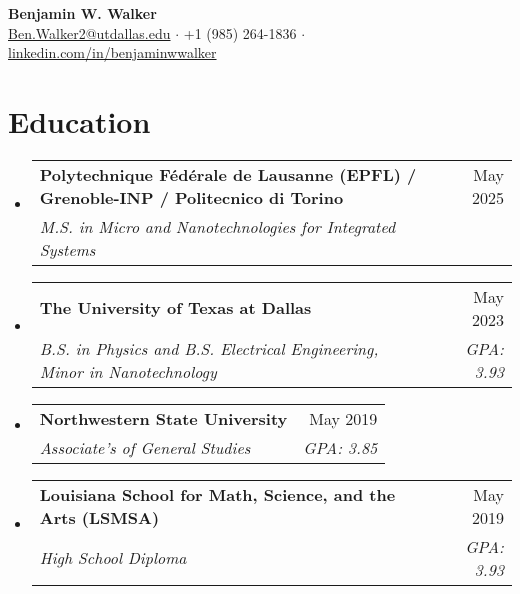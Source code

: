 \documentclass[letterpaper,11pt]{article}
\makeatletter
\newcommand{\resumeSubheading}[4]{
  \vspace{-2pt}\item
    \begin{tabular*}{0.97\textwidth}[t]{l@{\extracolsep{\fill}}r}
      \textbf{#1} & #2 \\
      \textit{\small#3} & \textit{\small #4} \\
    \end{tabular*}\vspace{-7pt}
}
\newcommand{\resumeSubHeadingListStart}{\begin{itemize}[leftmargin=0.15in, label={}]}
\newcommand{\resumeSubHeadingListEnd}{\end{itemize}}
\makeatother
\begin{document}
\begin{center}
    \textbf{\Large Benjamin W. Walker} \\ \vspace{5pt}
    \href{mailto:Ben.Walker2@utdallas.edu}{{Ben.Walker2@utdallas.edu}} 
    \hspace{1 pt} $\cdot$ \hspace{1 pt}
    +1 (985) 264-1836
    \hspace{1 pt} $\cdot$ \hspace{1 pt}
    \href{https://www.linkedin.com/in/benjaminwwalker/}{{linkedin.com/in/benjaminwwalker}}
    \vspace{-10pt}
\end{center}

\vspace{-10pt}


\section{Education}
  \resumeSubHeadingListStart
  \resumeSubheading
      {Polytechnique Fédérale de Lausanne (EPFL) / Grenoble-INP / Politecnico di Torino}{May 2025}
      {M.S. in Micro and Nanotechnologies for Integrated Systems}{}
    \resumeSubheading
      {The University of Texas at Dallas}{May 2023}
      {B.S. in Physics and B.S. Electrical Engineering, Minor in Nanotechnology}{GPA: 3.93}
    \resumeSubheading
      {Northwestern State University}{May 2019}
      {Associate's of General Studies}{GPA: 3.85}
    \resumeSubheading
    {Louisiana School for Math, Science, and the Arts \normalfont(LSMSA)}{May 2019}
    {High School Diploma}{GPA: 3.93}
  \resumeSubHeadingListEnd
\end{document}
